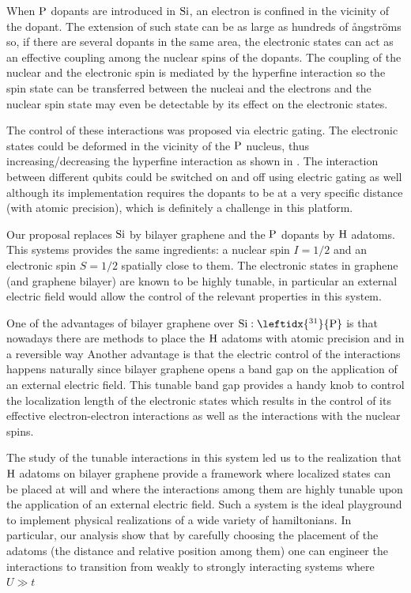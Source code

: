 When $\ce{P}$ dopants are introduced in $\ce{Si}$, an electron is confined in the vicinity of the dopant. The extension of such state can be as large as hundreds of ångströms so, if there are several dopants in the same area, the electronic states can act as an effective coupling among the nuclear spins of the dopants\cite{Slichter1990}. The coupling of the nuclear and the electronic spin is mediated by the hyperfine interaction so the spin state can be transferred between the nucleai and the electrons and the nuclear spin state may even be detectable by its effect on the electronic states\cite{Stich1996}.


The control of these interactions was proposed via electric gating. The electronic states could be deformed in the vicinity of the $\ce{P}$ nucleus, thus increasing/decreasing the hyperfine interaction as shown in .
The interaction between different qubits could be switched on and off using electric gating as well although its implementation requires the dopants to be at a very specific distance (with atomic precision), which is definitely a challenge in this platform.
\medskip

Our proposal replaces $\ce{Si}$ by bilayer graphene and the $\ce{P}$ dopants by $\ce{H}$ adatoms. This systems provides the same ingredients: a nuclear spin $I=1/2$ and an electronic spin $S=1/2$ spatially close to them. The electronic states in graphene (and graphene bilayer) are known to be highly tunable, in particular an external electric field would allow the control of the relevant properties in this system.

One of the advantages of bilayer graphene over $\ce{Si}:\leftidx{^{31}}{\ce{P}}$ is that nowadays there are methods to place the $\ce{H}$ adatoms with atomic precision and in a reversible way\cite{elias2009,Brihuega2016,Brihuega2017}
Another advantage is that the electric control of the interactions happens naturally since bilayer graphene opens a band gap on the application of an external electric field\cite{McCann2006, Castro2007, Oostinga2007, Zhang2009, Taychatanapat2010, Castro2010a, Ponomarenko2011, Allen2012, Sui2015}. This tunable band gap provides a handy knob to control the localization length of the electronic states which results in the control of its effective electron-electron interactions as well as the interactions with the nuclear spins.
\medskip

The study of the tunable interactions in this system led us to the realization that $\ce{H}$ adatoms on bilayer graphene provide a framework where localized states can be placed at will and where the interactions among them are highly tunable upon the application of an external electric field.
Such a system is the ideal playground to implement physical realizations of a wide variety of hamiltonians.
In particular, our analysis show that by carefully choosing the placement of the adatoms (the distance and relative position among them) one can engineer the interactions to transition from weakly to strongly interacting systems where $U\gg t$
\bigskip

